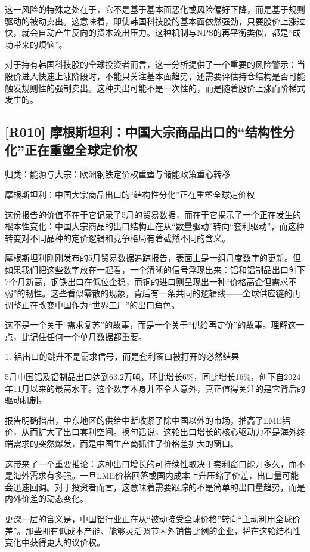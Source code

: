 \documentclass[11pt]{ctexart}
\begin{document}
这一风险的特殊之处在于，它不是基于基本面恶化或风险偏好下降，而是基于规则驱动的被动卖出。这意味着，即使韩国科技股的基本面依然强劲，只要股价上涨过快，就会自动产生反向的资本流出压力。这种机制与NPS的再平衡类似，都是“成功带来的烦恼”。

对于持有韩国科技股的全球投资者而言，这一分析提供了一个重要的风险警示：当股价进入快速上涨阶段时，不能只关注基本面趋势，还需要评估持仓结构是否可能触发规则性的强制卖出。这种卖出可能不是一次性的，而是随着股价上涨而阶梯式发生的。

\subsection{[R010] 摩根斯坦利：中国大宗商品出口的“结构性分化”正在重塑全球定价权}
{\small\color{refgray}归类：能源与大宗：欧洲钢铁定价权重塑与储能政策重心转移}

摩根斯坦利：中国大宗商品出口的“结构性分化”正在重塑全球定价权

这份报告的价值不在于它记录了5月的贸易数据，而在于它揭示了一个正在发生的根本性变化：中国大宗商品的出口结构正在从“数量驱动”转向“套利驱动”，而这种转变对不同品种的定价逻辑和竞争格局有着截然不同的含义。

摩根斯坦利刚刚发布的5月贸易数据追踪报告，表面上是一组月度数字的更新。但如果我们把这些数字放在一起看，一个清晰的信号浮现出来：铝和铝制品出口创下7个月新高，钢铁出口在低位企稳，而铜的进口则呈现出一种“价格高企但需求不弱”的韧性。这些看似零散的现象，背后有一条共同的逻辑线——全球供应链的再调整正在改变中国作为“世界工厂”的出口角色。

这不是一个关于“需求复苏”的故事，而是一个关于“供给再定价”的故事。理解这一点，比记住任何一个单月数据都重要。

1. 铝出口的跳升不是需求信号，而是套利窗口被打开的必然结果

5月中国铝及铝制品出口达到63.2万吨，环比增长6\%，同比增长16\%，创下自2024年11月以来的最高水平。这个数字本身并不令人意外，真正值得关注的是它背后的驱动机制。

报告明确指出，中东地区的供给中断收紧了除中国以外的市场，推高了LME铝价，从而扩大了出口套利空间。换句话说，这轮出口增长的核心驱动力不是海外终端需求的突然爆发，而是中国生产商抓住了价格差扩大的窗口。

这带来了一个重要推论：这种出口增长的可持续性取决于套利窗口能开多久，而不是海外需求有多强。一旦LME价格回落或国内成本上升压缩了价差，出口量可能会迅速回调。对于投资者而言，这意味着需要跟踪的不是简单的出口量趋势，而是内外价差的动态变化。

更深一层的含义是，中国铝行业正在从“被动接受全球价格”转向“主动利用全球价差”。那些拥有低成本产能、能够灵活调节内外销售比例的企业，将在这轮结构性变化中获得更大的议价权。
\end{document}
